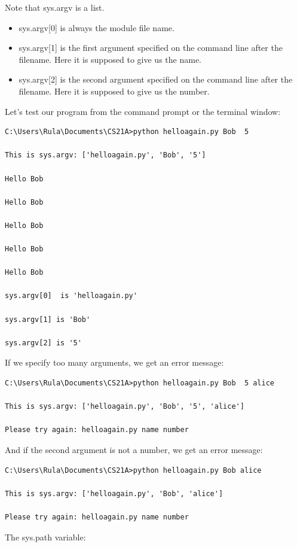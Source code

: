 \documentclass{article}
\begin{document}
Note that sys.argv is a list.

\begin{itemize}
\item sys.argv[0] is always the module file name.
\item sys.argv[1] is the first argument specified on the command line after the filename.  Here it is supposed to give us the name.
\item sys.argv[2] is the second argument specified on the command line after the filename.  Here it is supposed to give us the number.
\end{itemize}

Let's test our program from the command prompt or the terminal window:

\begin{lstlisting}
C:\Users\Rula\Documents\CS21A>python helloagain.py Bob  5        

This is sys.argv: ['helloagain.py', 'Bob', '5']

Hello Bob

Hello Bob

Hello Bob

Hello Bob

Hello Bob

sys.argv[0]  is 'helloagain.py'

sys.argv[1] is 'Bob'

sys.argv[2] is '5'
\end{lstlisting}

If we specify too many arguments, we get an error message:

\begin{lstlisting}
C:\Users\Rula\Documents\CS21A>python helloagain.py Bob  5 alice

This is sys.argv: ['helloagain.py', 'Bob', '5', 'alice']

Please try again: helloagain.py name number
\end{lstlisting}

And if the second argument is not a number, we get an error message:

\begin{lstlisting}
C:\Users\Rula\Documents\CS21A>python helloagain.py Bob alice   

This is sys.argv: ['helloagain.py', 'Bob', 'alice']

Please try again: helloagain.py name number
\end{lstlisting}

The sys.path variable:
\end{document}
